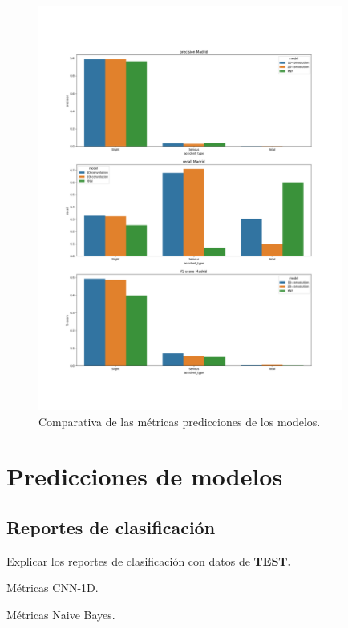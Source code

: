     \begin{figure}[h]
        \centering
        \includegraphics[width=10cm]{archivos/Resultados/Comparativa}
        \caption{Comparativa de las métricas predicciones de los modelos.}
        \label{ResultsImage}
     \end{figure}



\section{Predicciones de modelos}

  \subsection{Reportes de clasificación}

    Explicar los reportes de clasificación con datos de \textbf{TEST.}

    \begin{table}[H]
      \centering
      \caption{Métricas CNN-1D.}
      \label{CNN1DMetrics}
    \end{table}

    \begin{table}[H]
      \centering
      \caption{Métricas Naive Bayes.}
      \label{NBMetrics}
    \end{table}

